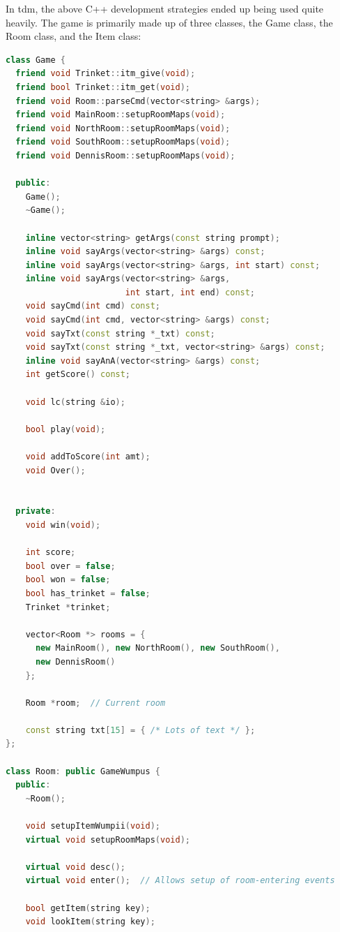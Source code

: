\documentclass[man,12pt]{apa6}
\begin{document}
In \textsf{tdm}, the above C++ development strategies ended up being used quite
heavily.  The game is primarily made up of three classes, the \textsf{Game}
class, the \textsf{Room} class, and the \textsf{Item} class:
\begin{singlespace}
\begin{framed}
\begin{lstlisting}[language=C++]
class Game {
  friend void Trinket::itm_give(void);
  friend bool Trinket::itm_get(void);
  friend void Room::parseCmd(vector<string> &args);
  friend void MainRoom::setupRoomMaps(void);
  friend void NorthRoom::setupRoomMaps(void);
  friend void SouthRoom::setupRoomMaps(void);
  friend void DennisRoom::setupRoomMaps(void);

  public:
    Game();
    ~Game();

    inline vector<string> getArgs(const string prompt);
    inline void sayArgs(vector<string> &args) const;
    inline void sayArgs(vector<string> &args, int start) const;
    inline void sayArgs(vector<string> &args,
                        int start, int end) const;
    void sayCmd(int cmd) const;
    void sayCmd(int cmd, vector<string> &args) const;
    void sayTxt(const string *_txt) const;
    void sayTxt(const string *_txt, vector<string> &args) const;
    inline void sayAnA(vector<string> &args) const;
    int getScore() const;

    void lc(string &io);

    bool play(void);

    void addToScore(int amt);
    void Over();


  private:
    void win(void);

    int score;
    bool over = false;
    bool won = false;
    bool has_trinket = false;
    Trinket *trinket;

    vector<Room *> rooms = {
      new MainRoom(), new NorthRoom(), new SouthRoom(),
      new DennisRoom()
    };

    Room *room;  // Current room

    const string txt[15] = { /* Lots of text */ };
};

class Room: public GameWumpus {
  public:
    ~Room();

    void setupItemWumpii(void);
    virtual void setupRoomMaps(void);

    virtual void desc();
    virtual void enter();  // Allows setup of room-entering events

    bool getItem(string key);
    void lookItem(string key);


\end{lstlisting}
\end{framed}
\end{singlespace}
\end{document}
